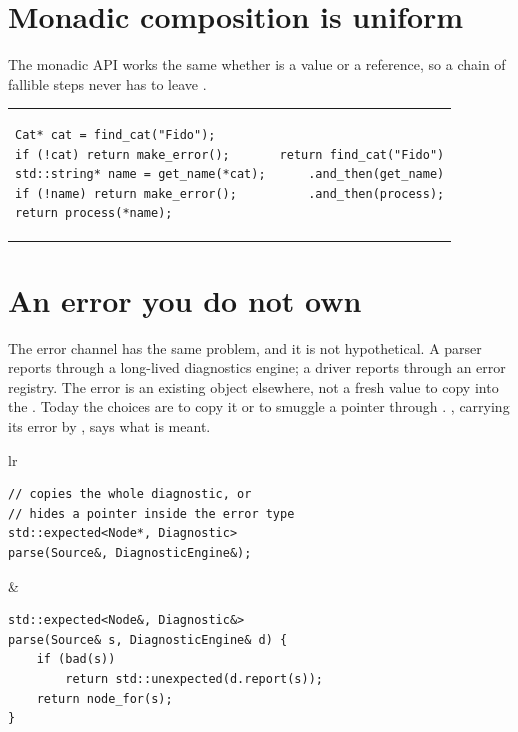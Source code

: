 \documentclass[a4paper,10pt,oneside,openany,final,article]{memoir}
\begin{document}
\section{Monadic composition is uniform}

The monadic API works the same whether  is a value or a reference, so
a chain of fallible steps never has to leave .

\begin{tabular}{ lr }
  \begin{minipage}[t]{0.45\columnwidth}
    \begin{verbatim}
Cat* cat = find_cat("Fido");
if (!cat) return make_error();
std::string* name = get_name(*cat);
if (!name) return make_error();
return process(*name);
    \end{verbatim}
  \end{minipage}
  &
    \begin{minipage}[t]{0.45\columnwidth}
      \begin{verbatim}
return find_cat("Fido")
    .and_then(get_name)
    .and_then(process);
      \end{verbatim}
    \end{minipage}
\end{tabular}

\section{An error you do not own}

The error channel has the same problem, and it is not hypothetical. A parser
reports through a long-lived diagnostics engine; a driver reports through an
error registry. The error is an existing object elsewhere, not a fresh value
to copy into the . Today the choices are to copy it or to
smuggle a pointer through . , carrying its
error by , says what is meant.

\begin{tabular}{ lr }
  \begin{minipage}[t]{0.45\columnwidth}
    \begin{verbatim}
// copies the whole diagnostic, or
// hides a pointer inside the error type
std::expected<Node*, Diagnostic>
parse(Source&, DiagnosticEngine&);
    \end{verbatim}
  \end{minipage}
  &
    \begin{minipage}[t]{0.45\columnwidth}
      \begin{verbatim}
std::expected<Node&, Diagnostic&>
parse(Source& s, DiagnosticEngine& d) {
    if (bad(s))
        return std::unexpected(d.report(s));
    return node_for(s);
}
      \end{verbatim}
    \end{minipage}
\end{tabular}
\end{document}
